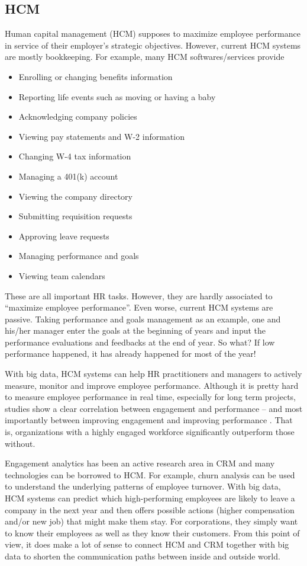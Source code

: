\documentclass[11pt]{book}
\begin{document}
\subsection{HCM}
Human capital management (HCM) supposes to maximize employee performance in service of their employer's strategic objectives. However, current HCM systems are mostly bookkeeping. For example, many HCM softwares/services provide \cite{AdpHcm}
\begin{itemize}
\item Enrolling or changing benefits information
\item Reporting life events such as moving or having a baby
\item Acknowledging company policies
\item Viewing pay statements and W-2 information
\item Changing W-4 tax information
\item Managing a 401(k) account
\item Viewing the company directory
\item Submitting requisition requests
\item Approving leave requests
\item Managing performance and goals
\item Viewing team calendars
\end{itemize}
These are all important HR tasks. However, they are hardly associated to ``maximize employee performance''. Even worse, current HCM systems are passive. Taking performance and goals management as an example, one and his/her manager enter the goals at the beginning of years and input the performance evaluations and feedbacks at the end of year. So what? If low performance happened, it has already happened for most of the year!

With big data, HCM systems can help HR practitioners and managers to actively measure, monitor and improve employee performance. Although it is pretty hard to measure employee performance in real time, especially for long term projects, studies show a clear correlation between engagement and performance -- and most importantly between improving engagement and improving performance \cite{MacLeodClarke2012}. That is, organizations with a highly engaged workforce significantly outperform those without.

Engagement analytics has been an active research area in CRM and many technologies can be borrowed to HCM. For example, churn analysis can be used to understand the underlying patterns of employee turnover. With big data, HCM systems can predict which high-performing employees are likely to leave a company in the next year and then offers possible actions (higher compensation and/or new job) that might make them stay. For corporations, they simply want to know their employees as well as they know their customers.  From this point of view, it does make a lot of sense to connect HCM and CRM together with big data to shorten the communication paths between inside and outside world.
\end{document}
